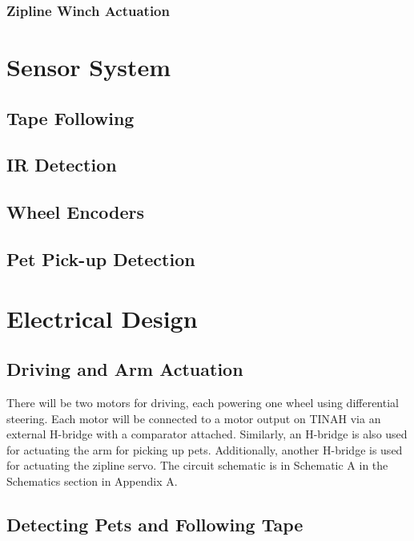 \documentclass[11pt, oneside]{article} %
\begin{document}
		\subsubsection{Zipline Winch Actuation}



\section{Sensor System}
	
	\subsection{Tape Following}
	
	\subsection{IR Detection}
	
	\subsection{Wheel Encoders}
	
	\subsection{Pet Pick-up Detection}
	

\section{Electrical Design}

	\subsection{Driving and Arm Actuation}
	
	There will be two motors for driving, each powering one wheel using differential steering. Each motor will be connected to a motor output on TINAH via an external H-bridge with a comparator attached. Similarly, an H-bridge is also used for actuating the arm for picking up pets. Additionally, another H-bridge is used for actuating the zipline servo. The circuit schematic is in Schematic A in the Schematics section in Appendix A.
	
	\subsection{Detecting Pets and Following Tape}
	
\end{document}
